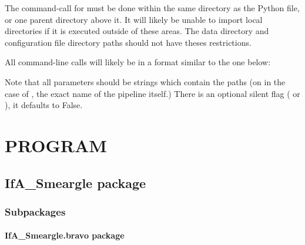 \documentclass[letterpaper,10pt,english]{sphinxmanual}
\begin{document}
The command-call for  must be done within the same directory
as the Python file, or one parent directory above it. It will likely be unable
to import local directories if it is executed outside of these areas. The
data directory and configuration file directory paths should not have theses
restrictions.

All command-line calls will likely be in a format similar to the one below:

\begin{sphinxVerbatim}[commandchars=\\\{\}]
    
\end{sphinxVerbatim}

Note that all parameters should be strings which contain the paths (on in the
case of , the exact name of the pipeline itself.) There is
an optional silent flag ( or ), it defaults to False.


\chapter{PROGRAM}
\label{\detokenize{python_docstrings/modules:program}}\label{\detokenize{python_docstrings/modules::doc}}

\section{IfA\_Smeargle package}
\label{\detokenize{python_docstrings/IfA_Smeargle:ifa-smeargle-package}}\label{\detokenize{python_docstrings/IfA_Smeargle::doc}}

\subsection{Subpackages}
\label{\detokenize{python_docstrings/IfA_Smeargle:subpackages}}

\subsubsection{IfA\_Smeargle.bravo package}
\label{\detokenize{python_docstrings/IfA_Smeargle.bravo:ifa-smeargle-bravo-package}}\label{\detokenize{python_docstrings/IfA_Smeargle.bravo::doc}}
\end{document}
